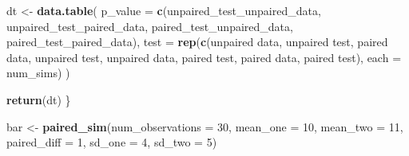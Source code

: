 \documentclass[
]{book}
\newenvironment{Shaded}{\begin{snugshade}}{\end{snugshade}}
\newcommand{\AttributeTok}[1]{\textcolor[rgb]{0.13,0.29,0.53}{#1}}
\newcommand{\DecValTok}[1]{\textcolor[rgb]{0.00,0.00,0.81}{#1}}
\newcommand{\FunctionTok}[1]{\textcolor[rgb]{0.13,0.29,0.53}{\textbf{#1}}}
\newcommand{\NormalTok}[1]{#1}
\newcommand{\OtherTok}[1]{\textcolor[rgb]{0.56,0.35,0.01}{#1}}
\newcommand{\StringTok}[1]{\textcolor[rgb]{0.31,0.60,0.02}{#1}}
\theoremstyle{definition}
\theoremstyle{definition}
\theoremstyle{definition}
\theoremstyle{definition}
\theoremstyle{remark}
\begin{document}
\begin{Shaded}
\begin{Highlighting}[]
\NormalTok{  dt }\OtherTok{\textless{}{-}} \FunctionTok{data.table}\NormalTok{(}
    \AttributeTok{p\_value =} \FunctionTok{c}\NormalTok{(unpaired\_test\_unpaired\_data, unpaired\_test\_paired\_data, }
\NormalTok{                paired\_test\_unpaired\_data,   paired\_test\_paired\_data), }
    \AttributeTok{test    =} \FunctionTok{rep}\NormalTok{(}\FunctionTok{c}\NormalTok{(}\StringTok{\textquotesingle{}unpaired data, unpaired test\textquotesingle{}}\NormalTok{, }\StringTok{\textquotesingle{}paired data, unpaired test\textquotesingle{}}\NormalTok{, }
                    \StringTok{\textquotesingle{}unpaired data, paired test\textquotesingle{}}\NormalTok{, }\StringTok{\textquotesingle{}paired data, paired test\textquotesingle{}}\NormalTok{), }\AttributeTok{each =}\NormalTok{ num\_sims)}
\NormalTok{  )}
  
  \FunctionTok{return}\NormalTok{(dt)}
\NormalTok{\}}
\end{Highlighting}
\end{Shaded}

\begin{Shaded}
\begin{Highlighting}[]
\NormalTok{bar }\OtherTok{\textless{}{-}} \FunctionTok{paired\_sim}\NormalTok{(}\AttributeTok{num\_observations =} \DecValTok{30}\NormalTok{,  }\AttributeTok{mean\_one =} \DecValTok{10}\NormalTok{, }\AttributeTok{mean\_two =} \DecValTok{11}\NormalTok{, }\AttributeTok{paired\_diff =} \DecValTok{1}\NormalTok{, }\AttributeTok{sd\_one =} \DecValTok{4}\NormalTok{, }\AttributeTok{sd\_two =} \DecValTok{5}\NormalTok{)}
\end{Highlighting}
\end{Shaded}
\end{document}
